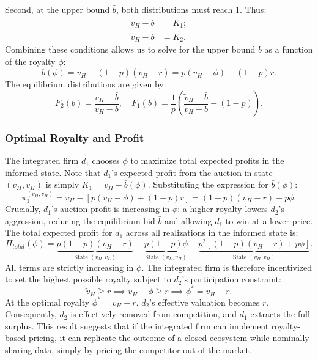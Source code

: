 \documentclass[11pt]{article}
\theoremstyle{plain}
\theoremstyle{definition}
\theoremstyle{plain}
\theoremstyle{plain}
\theoremstyle{plain}
\theoremstyle{plain}
\numberwithin{equation}{section}
\begin{document}
Second, at the upper bound $\bar{b}$, both distributions must reach 1. Thus:
\begin{align*}
    v_H - \bar{b} &= K_1; \\
    \tilde{v}_H - \bar{b} &= K_2.
\end{align*}
Combining these conditions allows us to solve for the upper bound $\bar{b}$ as a function of the royalty $\phi$:
\begin{equation*}
    \bar{b}(\phi) = \tilde{v}_H - (1-p)(\tilde{v}_H - r) = p(v_H - \phi) + (1-p)r.
\end{equation*}
The equilibrium distributions are given by:
\begin{equation*}
    F_2(b) = \frac{v_H - \bar{b}}{v_H - b}, \quad F_1(b) = \frac{1}{p} \left( \frac{\tilde{v}_H - \bar{b}}{\tilde{v}_H - b} - (1-p) \right).
\end{equation*}

\subsubsection{Optimal Royalty and Profit}
The integrated firm $d_1$ chooses $\phi$ to maximize total expected profits in the informed state. Note that $d_1$'s expected profit from the auction in state $(v_H,v_H)$ is simply $K_1 = v_H - \bar{b}(\phi)$. Substituting the expression for $\bar{b}(\phi)$:
\begin{equation*}
    \pi^{(v_H,v_H)}_1 = v_H - [p(v_H - \phi) + (1-p)r] = (1-p)(v_H-r) + p\phi.
\end{equation*}
Crucially, $d_1$'s auction profit is increasing in $\phi$: a higher royalty lowers $d_2$'s aggression, reducing the equilibrium bid $\bar{b}$ and allowing $d_1$ to win at a lower price.
The total expected profit for $d_1$ across all realizations in the informed state is:
\begin{equation*}
    \Pi_{total}(\phi) = \underbrace{p(1-p)(v_H-r)}_{\text{State } (v_H,v_L)} + \underbrace{p(1-p)\phi}_{\text{State } (v_L,v_H)} + \underbrace{p^2 \left[ (1-p)(v_H-r) + p\phi \right]}_{\text{State } (v_H,v_H)}.
\end{equation*}
All terms are strictly increasing in $\phi$. The integrated firm is therefore incentivized to set the highest possible royalty subject to $d_2$'s participation constraint:
\begin{equation*}
    \tilde{v}_H \ge r \implies v_H - \phi \ge r \implies \phi^* = v_H - r.
\end{equation*}
At the optimal royalty $\phi^* = v_H-r$, $d_2$'s effective valuation becomes $r$. Consequently, $d_2$ is effectively removed from competition, and $d_1$ extracts the full surplus. This result suggests that if the integrated firm can implement royalty-based pricing, it can replicate the outcome of a closed ecosystem while nominally sharing data, simply by pricing the competitor out of the market.
\end{document}
